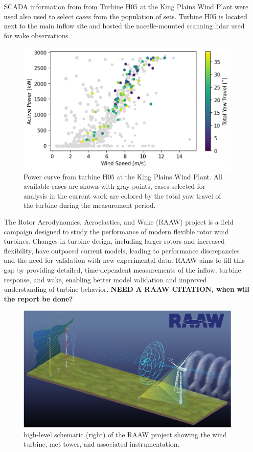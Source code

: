 \documentclass[%
 aip,
 amsmath,
 amssymb,
preprint,%
]{revtex4-2}
\begin{document}
SCADA information from from Turbine H05 at the King Plains Wind Plant were used also used to select cases from the population of sets.
Turbine H05 is located next to the main inflow site and hosted the nacelle-mounted scanning lidar used for wake observations.
\begin{figure}
    \centering
    \includegraphics[width=0.65\linewidth]{figs/power_curve_cases_20240911.png}
    \caption{Power curve from turbine H05 at the King Plains Wind Plant. All available cases are shown with gray points, cases selected for analysis in the current work are colored by the total yaw travel of the turbine during the measurement period.}
    \label{fig:power_curve_cases}
\end{figure}

The Rotor Aerodynamics, Aeroelastics, and Wake (RAAW) project is a field campaign designed to study the performance of modern flexible rotor wind turbines. Changes in turbine design, including larger rotors and increased flexibility, have outpaced current models, leading to performance discrepancies and the need for validation with new experimental data. RAAW aims to fill this gap by providing detailed, time-dependent measurements of the inflow, turbine response, and wake, enabling better model validation and improved understanding of turbine behavior. \textbf{NEED A RAAW CITATION, when will the report be done?}

\begin{figure}[h]
    \centering
    \includegraphics[width=0.5\linewidth]{figs/raawSchem_20240923.png}
    \caption{ high-level schematic (right) of the RAAW project showing the wind turbine, met tower, and associated instrumentation.}
    \label{fig:raawSchem}
\end{figure}
\end{document}
